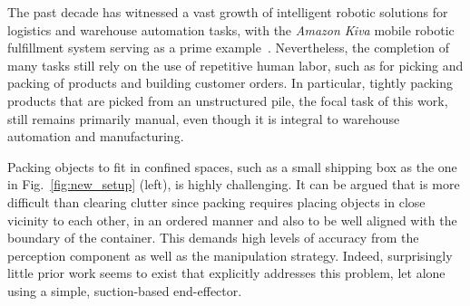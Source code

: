 The past decade has witnessed a vast growth of intelligent robotic solutions for logistics and warehouse automation tasks, with the {\it Amazon Kiva} mobile robotic fulfillment system serving as a prime example~\cite{Enright:2011:OCA:2908675.2908681}.  Nevertheless, the completion of many tasks still rely on the use of repetitive human labor, such as for picking and packing of products and building customer orders.  In particular, tightly packing products that are picked from an unstructured pile, the focal task of this work, still remains primarily manual, even though it is integral to warehouse automation and manufacturing.

Packing objects to fit in confined spaces, such as a small shipping box as the one in Fig.~\ref{fig:new_setup} (left), is highly challenging. It can be argued that is more difficult than clearing clutter since packing requires placing objects in close vicinity to each other, in an ordered manner and also to be well aligned with the boundary of the container. This demands high levels of accuracy from the perception component as well as the manipulation strategy. Indeed, surprisingly little prior work seems to exist that explicitly addresses this problem, let alone using a simple, suction-based end-effector.



